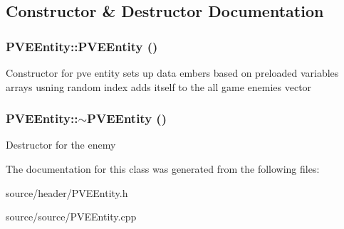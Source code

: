 \subsection{Constructor \& Destructor Documentation}
\hypertarget{classPVEEntity_ab00e5efa6fb12a9661df9a1c74c72168}{
\subsubsection[{PVEEntity}]{\setlength{\rightskip}{0pt plus 5cm}PVEEntity::PVEEntity ()}}
\label{df/dde/classPVEEntity_ab00e5efa6fb12a9661df9a1c74c72168}
Constructor for pve entity sets up data embers based on preloaded variables arrays usning random index adds itself to the all game enemies vector \hypertarget{classPVEEntity_aac5b1b2d4ecf705c32734907741d56d2}{
\subsubsection[{$\sim$PVEEntity}]{\setlength{\rightskip}{0pt plus 5cm}PVEEntity::$\sim$PVEEntity ()}}
\label{df/dde/classPVEEntity_aac5b1b2d4ecf705c32734907741d56d2}
Destructor for the enemy 

The documentation for this class was generated from the following files:\begin{DoxyCompactItemize}
\item 
source/header/PVEEntity.h\item 
source/source/PVEEntity.cpp\end{DoxyCompactItemize}
